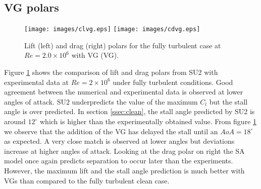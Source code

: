 \subsection{VG polars}\label{ssec:vg}
\begin{figure}[h]
    \centering
    \texttt{[image: images/clvg.eps]}
    \texttt{[image: images/cdvg.eps]} 
    \vspace*{-0.5cm}
    \caption{Lift (left) and drag (right) polars for the fully turbulent case at $Re=2.0\times10^6$ with VG (VG).}
   \label{fig:vgpolar}
\end{figure}
Figure \ref{fig:vgpolar} shows the comparison of lift and drag polars from SU2 with experimental data\cite{baldacchino2018experimental} at $Re = 2\times10^6$ under fully turbulent conditions. Good agreement between the numerical and experimental data is observed at lower angles of attack. SU2 underpredicts the value of the maximum $C_l$ but the stall angle is over predicted. In section \ref{ssec:clean}, the stall angle predicted by SU2 is around $12^{\circ}$ which is higher than the experimentally obtained value. From figure \ref{fig:vgpolar} we observe that the addition of the VG has delayed the stall until an $AoA=18^{\circ}$ as expected. A very close match is observed at lower angles but deviations increase at higher angles of attack. Looking at the drag polar on right the SA model once again predicts separation to occur later than the experiments. However, the maximum lift and the stall angle prediction is much better with VGs than compared to the fully turbulent clean case.

